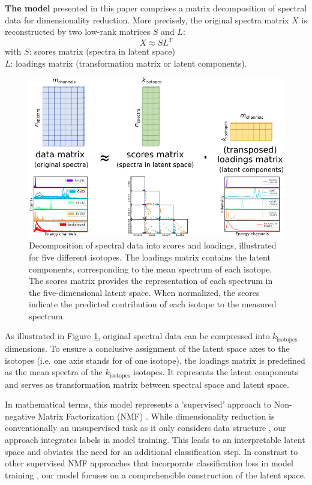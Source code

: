 \documentclass[preprint,12pt, a4paper]{elsarticle}
\begin{document}
\textbf{The model} presented in this paper comprises a matrix decomposition of spectral data for dimensionality reduction. More precisely, the original spectra matrix $X$ is reconstructed by two low-rank matrices $S$ and $L$:  
$$ X \approx S  L^{T} $$  
with $S$: scores matrix (spectra in latent space) \\  
\hspace*{0.8cm} $L$: loadings matrix (transformation matrix or latent components). \\ 

\begin{figure}
\includegraphics[width=\textwidth]{matrix_decomposition.png}
\caption{Decomposition of spectral data into scores and loadings, illustrated for five different isotopes. The loadings matrix contains the latent components, corresponding to the mean spectrum of each isotope. The scores matrix provides the representation of each spectrum in the five-dimensional latent space. When normalized, the scores indicate the predicted contribution of each isotope to the measured spectrum.}
\label{fig:matrix_decomposition}
\end{figure}

As illustrated in Figure \ref{fig:matrix_decomposition}, original spectral data can be compressed into $k_\mathrm{isotopes}$ dimensions. To ensure a conclusive assignment of the latent space axes to the isotopes (i.e. one axis stands for of one isotope), the loadings matrix is predefined as the mean spectra of the $k_\mathrm{isotopes}$ isotopes. It represents the latent components and serves as transformation matrix between spectral space and latent space.

In mathematical terms, this model represents a 'supervised' approach to Non-negative Matrix Factorization (NMF) \cite{Shreeves2020, Bilton2019}. 
While dimensionality reduction is conventionally an unsupervised task as it only considers data structure \cite{Olaya2022}, our approach integrates labels in model training. This leads to an interpretable latent space and obviates the need for an additional classification step. In constrast to other supervised NMF approaches that incorporate classification loss in model training \cite{Leuschner2019, Lee2010, Bisot2016}, our model focuses on a comprehensible construction of the latent space. \\
\end{document}
